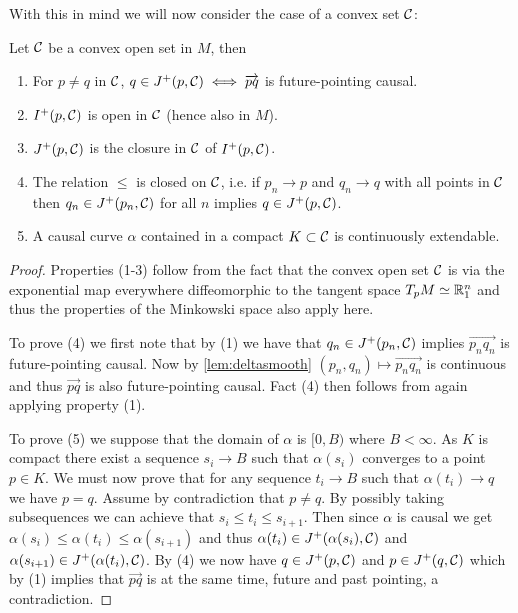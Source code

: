 With this in mind we will now consider the case of a convex set $\mathcal{C}$:
\begin{lemma}\label{lem:convtopo}
Let $\mathcal{C}$ be a convex open set in $M$, then
\begin{enumerate}[label={\textnormal{(\arabic*)}}]
    \item For $p\neq q$ in $\mathcal{C}$, $q\in J^+(p,\mathcal{C}) \iff \overrightarrow{pq}$ is future-pointing causal.
    \item $I^+(p,\mathcal{C})$ is open in $\mathcal{C}$ (hence also in $M$).
    \item $J^+(p,\mathcal{C})$ is the closure in $\mathcal{C}$ of $I^+(p,\mathcal{C})$.
    \item The relation $\leq$ is closed on $\mathcal{C}$, i.e. if $p_n \to p$ and $q_n \to q$ with all points in $\mathcal{C}$ then $q_n\in J^+(p_n,\mathcal{C})$ for all $n$ implies $q\in J^+(p,\mathcal{C})$.
    \item A causal curve $\alpha$ contained in a compact $K\subset\mathcal{C}$ is continuously extendable. 
\end{enumerate}
\end{lemma}
\begin{proof}
Properties (1-3) follow from the fact that the convex open set $\mathcal{C}$ is via the exponential map everywhere diffeomorphic to the tangent space $T_pM\simeq \mathbb{R}^n_1$ and thus the properties of the Minkowski space also apply here.

To prove (4) we first note that by (1) we have that $q_n\in J^+(p_n,\mathcal{C})$ implies $\overrightarrow{p_nq_n}$ is future-pointing causal. Now by \ref{lem:deltasmooth} $(p_n,q_n)\mapsto\overrightarrow{p_nq_n}$ is continuous and thus $\overrightarrow{pq}$ is also future-pointing causal. Fact (4) then follows from again applying property (1). 

To prove (5) we suppose that the domain of $\alpha$ is $[0,B)$ where $B<\infty$. As $K$ is compact there exist a sequence $s_i\to B$ such that $\alpha(s_i)$ converges to a point $p\in K$. We must now prove that for any sequence $t_i\to B$ such that $\alpha(t_i)\to q$ we have $p=q$. Assume by contradiction that $p\neq q$. By possibly taking subsequences we can achieve that $s_i \le t_i \le s_{i+1}$.
Then since $\alpha$ is causal we get  $\alpha(s_i)\le \alpha(t_i) \le \alpha(s_{i+1})$ and thus $\alpha(t_i) \in J^+(\alpha(s_i),\mathcal{C})$ and $\alpha(s_{i+1}) \in J^+(\alpha(t_i),\mathcal{C})$. By (4) we now have $q\in J^+(p,\mathcal{C})$ and $p\in J^+(q,\mathcal{C})$ which by (1) implies that $\overrightarrow{pq}$ is at the same time, future and past pointing, a contradiction.
\end{proof}

